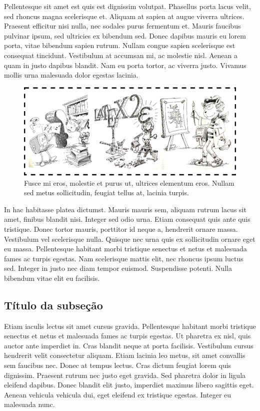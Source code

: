 \documentclass[%
a4paper, %
twocolumn, %
10pt %
]{article}
\begin{document}
Pellentesque sit amet est quis est dignissim volutpat. Phasellus porta lacus velit, sed rhoncus magna scelerisque et. Aliquam at sapien at augue viverra ultrices. Praesent efficitur nisi nulla, nec sodales purus fermentum et. Mauris faucibus pulvinar ipsum, sed ultricies ex bibendum sed. Donec dapibus mauris eu lorem porta, vitae bibendum sapien rutrum. Nullam congue sapien scelerisque est consequat tincidunt. Vestibulum at accumsan mi, ac molestie nisl. Aenean a quam in justo dapibus blandit. Nam eu porta tortor, ac viverra justo. Vivamus mollis urna malesuada dolor egestas lacinia.
\begin{figure}[htb]
\centering
\includegraphics[width=12cm]{figura1.eps}
\caption{Fusce mi eros, molestie et purus ut, ultrices elementum eros. Nullam sed metus sollicitudin, feugiat tellus at, lacinia turpis.}
\end{figure}

In hac habitasse platea dictumst. Mauris mauris sem, aliquam rutrum lacus sit amet, finibus blandit nisi. Integer sed odio urna. Etiam consequat quis ante quis tristique. Donec tortor mauris, porttitor id neque a, hendrerit ornare massa. Vestibulum vel scelerisque nulla. Quisque nec urna quis ex sollicitudin ornare eget eu massa. Pellentesque habitant morbi tristique senectus et netus et malesuada fames ac turpis egestas. Nam scelerisque mattis elit, nec rhoncus ipsum luctus sed. Integer in justo nec diam tempor euismod. Suspendisse potenti. Nulla bibendum vitae elit eu facilisis.

\subsection{Título da subseção}
Etiam iaculis lectus sit amet cursus gravida. Pellentesque habitant morbi tristique senectus et netus et malesuada fames ac turpis egestas. Ut pharetra ex nisl, quis auctor ante imperdiet in. Cras blandit neque at porta facilisis. Vestibulum cursus hendrerit velit consectetur aliquam. Etiam lacinia leo metus, sit amet convallis sem faucibus nec. Donec at tempus lectus. Cras dictum feugiat lorem quis dignissim. Praesent rutrum nec justo eget gravida. Sed pharetra dolor in ligula eleifend dapibus. Donec blandit elit justo, imperdiet maximus libero sagittis eget. Aenean vehicula vehicula dui, eget eleifend ex tristique egestas. Integer eu malesuada nunc. 
\end{document}
